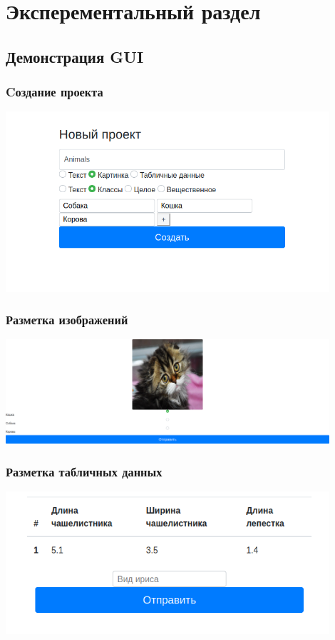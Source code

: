 \section{Эксперементальный раздел}

\subsection{Демонстрация GUI}

\begin{frame}
    \frametitle{Cоздание проекта}
    \includegraphics[width=0.9\textwidth]{./create_project.png}
\end{frame}


\begin{frame}
    \frametitle{Разметка изображений}
    \includegraphics[width=0.9\textwidth]{./animalslabel.png}
\end{frame}

\begin{frame}
    \frametitle{Разметка табличных данных}
    \includegraphics[width=0.9\textwidth]{./tablelabel.png}
\end{frame}
